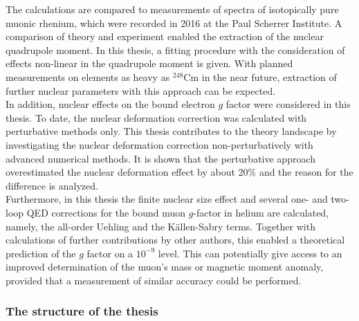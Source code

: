 The calculations are compared to measurements of spectra of isotopically pure muonic rhenium, which were recorded in 2016 at the Paul Scherrer Institute. A comparison of theory and experiment enabled the extraction of the nuclear quadrupole moment. In this thesis, a fitting procedure with the consideration of effects non-linear in the quadrupole moment is given.
With planned measurements on elements as heavy as $^{248}\text{Cm}$ in the near future, extraction of further nuclear parameters with this approach can be expected.\\[11pt]%
In addition, nuclear effects on the bound electron $g$ factor were considered in this thesis. To date, the nuclear deformation correction was calculated with perturbative methods only. This thesis contributes to the theory landscape by investigating the nuclear deformation correction non-perturbatively with advanced numerical methods. It is shown that the perturbative approach overestimated the nuclear deformation effect by about 20\% and the reason for the difference is analyzed.\\[11pt]%
Furthermore, in this thesis the finite nuclear size effect and several one- and two-loop QED corrections for the bound muon $g$-factor in helium are calculated, namely, the all-order Uehling and the Källen-Sabry terms. Together with calculations of further contributions by other authors, this enabled a theoretical prediction of the $g$ factor on a $10^{-9}$ level. This can potentially give access to an improved determination of the muon's mass or magnetic moment anomaly, provided that a measurement of similar accuracy could be performed.


\subsubsection*{The structure of the thesis}


